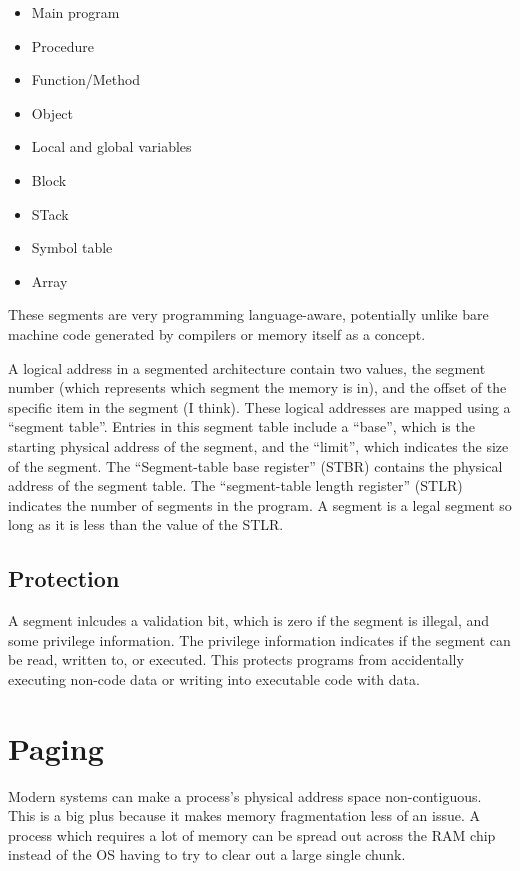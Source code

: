 \documentclass{article}
\begin{document}
\begin{itemize}
	\item Main program
	\item Procedure
	\item Function/Method
	\item Object
	\item Local and global variables
	\item Block
	\item STack
	\item Symbol table
	\item Array
\end{itemize}

These segments are very programming language-aware, potentially unlike bare
machine code generated by compilers or memory itself as a concept.

A logical address in a segmented architecture contain two values, the segment
number (which represents which segment the memory is in), and the offset of the
specific item in the segment (I think). These logical addresses are mapped
using a ``segment table''. Entries in this segment table include a ``base'',
which is the starting physical address of the segment, and the ``limit'', which
indicates the size of the segment. The ``Segment-table base register'' (STBR)
contains the physical address of the segment table. The ``segment-table length
register'' (STLR) indicates the number of segments in the program. A segment
is a legal segment so long as it is less than the value of the STLR.

\subsection{Protection}
A segment inlcudes a validation bit, which is zero if the segment is illegal,
and some privilege information. The privilege information indicates if the
segment can be read, written to, or executed. This protects programs from
accidentally executing non-code data or writing into executable code with data.

\section{Paging}
Modern systems can make a process's physical address space non-contiguous. This
is a big plus because it makes memory fragmentation less of an issue. A
process which requires a lot of memory can be spread out across the RAM chip
instead of the OS having to try to clear out a large single chunk.
\end{document}
